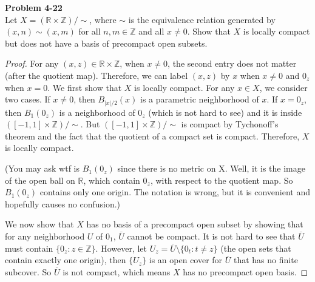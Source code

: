 \documentclass[12pt, a4paper]{article}
\theoremstyle{plain}
\newcommand{\R}{\mathbb{R}}
\newcommand{\Z}{\mathbb{Z}}
\newenvironment{problem}[2][Problem]
    { \begin{mdframed}[backgroundcolor=gray!20] \textbf{#1 #2} \\}
    {  \end{mdframed}}
\begin{document}
\begin{problem}{4-22}
    Let $X = (\R\times \Z)/\sim$, where $\sim$ is the equivalence relation generated by $(x,n)\sim (x,m)$ for all $n,m\in\Z$ and all $x\neq 0$. Show that $X$ is locally compact but does not have a basis of precompact open subsets.
\end{problem}
    \begin{proof}
        For any $(x,z)\in \R\times \Z$, when $x\neq 0$, the second entry does not matter (after the quotient map). Therefore, we can label $(x,z)$ by $x$ when $x\neq 0$ and $0_z$ when $x=0$. We first show that $X$ is locally compact. For any $x\in X$, we consider two cases. If $x\neq 0$, then $B_{|x|/2}(x)$ is a parametric neighborhood of $x$. If $x=0_z$, then $B_1(0_z)$ is a neighborhood of $0_z$ (which is not hard to see) and it is inside $([-1,1]\times \Z)/\sim$. But $([-1,1]\times \Z)/\sim$ is compact by Tychonoff's theorem and the fact that the quotient of a compact set is compact. Therefore, $X$ is locally compact. 

        (You may ask wtf is $B_1(0_z)$ since there is no metric on X. Well, it is the image of the open ball on $\R$, which contain $0_z$, with respect to the quotient map. So $B_1(0_z)$ contains only one origin. The notation is wrong, but it is convenient and hopefully causes no confusion.)

        We now show that $X$ has no basis of a precompact open subset by showing that for any neighborhood $U$ of $0_1$, $\overline{U}$ cannot be compact. It is not hard to see that $\overline{U}$ must contain $\{0_z:z\in\Z\}$. However, let $U_z = \overline{U}\setminus \{0_t:t\neq z\}$ (the open sets that contain exactly one origin), then $\{U_z\}$ is an open cover for $\overline{U}$ that has no finite subcover. So $\overline{U}$ is not compact, which means $X$ has no precompact open basis.
    \end{proof}
\end{document}
